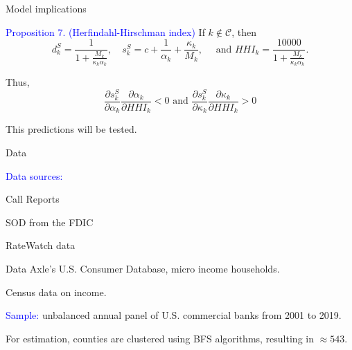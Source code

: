 \documentclass[notes,10pt, aspectratio=169]{beamer}
\newenvironment{wideitemize}{\itemize\addtolength{\itemsep}{10pt}}{\enditemize}
\begin{document}
    \begin{frame}{Model implications}

        \begin{wideitemize}
    
            \item \textcolor{blue}{Proposition 7. (Herfindahl-Hirschman index)} If $k \notin \mathcal{C}$, then
            $$
            d_k^S=\frac{1}{1+\frac{M_k}{\kappa_k \alpha_k}}, \quad s_k^S=c+\frac{1}{\alpha_k}+\frac{\kappa_k}{M_k}, \quad \text { and } H H I_k=\frac{10000}{1+\frac{M_k}{\kappa_k \alpha_k}} .
            $$
            \item Thus,
            $$
            \frac{\partial s_k^S}{\partial \alpha_k} \frac{\partial \alpha_k}{\partial H H I_k}<0 \text { and } \frac{\partial s_k^S}{\partial \kappa_k} \frac{\partial \kappa_k}{\partial H H I_k}>0
            $$

  \item This predictions will be tested. 
        \end{wideitemize}
        \end{frame}

\begin{frame}{Data}
    
    \begin{wideitemize}
        \item \textcolor{blue}{Data sources:}
        \item \vspace{0.2cm}
          \begin{wideitemize}
            \item Call Reports
            \item SOD from the FDIC
            \item RateWatch data
            \item Data Axle's U.S. Consumer Database, micro income households. 
            \item Census data on income.
           
            \end{wideitemize}

        \item \textcolor{blue}{Sample:} unbalanced annual panel of U.S. commercial banks from 2001 to 2019.
        
        \item For estimation, counties are clustered using BFS algorithms, resulting in $\approx 543$. 
    \end{wideitemize}
    
\end{frame}
    
\end{document}
